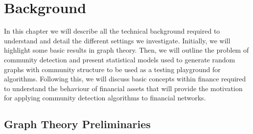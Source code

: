 
\chapter{Background}

\label{cha:background}


In this chapter we will describe all the technical background required to understand and detail the different settings we investigate.
Initially, we will highlight some basic results in graph theory.
Then, we will outline the problem of community detection and present statistical models used to generate random graphs with community structure to be used as a testing playground for algorithms.
Following this, we will discuss basic concepts within finance required to understand the behaviour of financial assets that will provide the motivation for applying community detection algorithms to financial networks.


\section{Graph Theory Preliminaries}
\label{sec:graphTheoryBackground}

